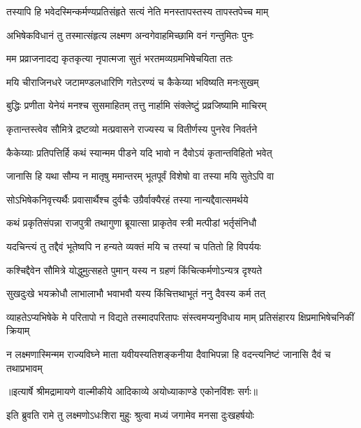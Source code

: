 \twolineshloka
{तस्यापि हि भवेदस्मिन्कर्मण्यप्रतिसंहृते}
{सत्यं नेति मनस्तापस्तस्य तापस्तपेच्च माम्} %

\twolineshloka
{अभिषेकविधानं तु तस्मात्संहृत्य लक्ष्मण}
{अन्वगेवाहमिच्छामि वनं गन्तुमितः पुनः} %

\twolineshloka
{मम प्रव्राजनादद्य कृतकृत्या नृपात्मजा}
{सुतं भरतमव्यग्रमभिषेचयिता ततः} %

\twolineshloka
{मयि चीराजिनधरे जटामण्डलधारिणि}
{गतेऽरण्यं च कैकेय्या भविष्यति मनःसुखम्} %

\twolineshloka
{बुद्धिः प्रणीता येनेयं मनश्च सुसमाहितम्}
{तत्तु नार्हामि संक्लेष्टुं प्रव्रजिष्यामि माचिरम्} %

\twolineshloka
{कृतान्तस्त्वेव सौमित्रे द्रष्टव्यो मत्प्रवासने}
{राज्यस्य च वितीर्णस्य पुनरेव निवर्तने} %

\twolineshloka
{कैकेय्याः प्रतिपत्तिर्हि कथं स्यान्मम पीडने}
{यदि भावो न दैवोऽयं कृतान्तविहितो भवेत्} %

\twolineshloka
{जानासि हि यथा सौम्य न मातृषु ममान्तरम्}
{भूतपूर्वं विशेषो वा तस्या मयि सुतेऽपि वा} %

\twolineshloka
{सोऽभिषेकनिवृत्त्यर्थैः प्रवासार्थैश्च दुर्वचैः}
{उग्रैर्वाक्यैरहं तस्या नान्यद्दैवात्समर्थये} %

\twolineshloka
{कथं प्रकृतिसंपन्ना राजपुत्री तथागुणा}
{ब्रूयात्सा प्राकृतेव स्त्री मत्पीडां भर्तृसंनिधौ} %

\twolineshloka
{यदचिन्त्यं तु तद्दैवं भूतेष्वपि न हन्यते}
{व्यक्तं मयि च तस्यां च पतितो हि विपर्ययः} %

\twolineshloka
{कश्चिद्दैवेन सौमित्रे योद्धुमुत्सहते पुमान्}
{यस्य न ग्रहणं किंचित्कर्मणोऽन्यत्र दृश्यते} %

\twolineshloka
{सुखदुःखे भयक्रोधौ लाभालाभौ भवाभवौ}
{यस्य किंचित्तथाभूतं ननु दैवस्य कर्म तत्} %

\threelineshloka
{व्याहतेऽप्यभिषेके मे परितापो न विद्यते}
{तस्मादपरितापः संस्त्वमप्यनुविधाय माम्}
{प्रतिसंहारय क्षिप्रमाभिषेचनिकीं क्रियाम्} %

\fourlineindentedshloka
{न लक्ष्मणास्मिन्मम राज्यविघ्ने}
{ माता यवीयस्यतिशङ्कनीया}
{दैवाभिपन्ना हि वदन्त्यनिष्टं}
{ जानासि दैवं च तथाप्रभावम्} %


{॥इत्यार्षे श्रीमद्रामायणे वाल्मीकीये आदिकाव्ये अयोध्याकाण्डे एकोनविंशः सर्गः॥}


\twolineshloka
{इति ब्रुवति रामे तु लक्ष्मणोऽधःशिरा मुहुः}
{श्रुत्वा मध्यं जगामेव मनसा दुःखहर्षयोः} %

